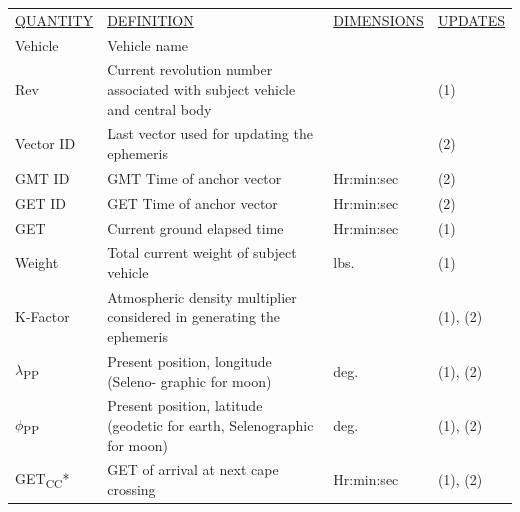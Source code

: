 \documentclass[11pt]{article} %
\begin{document}
\begin{center}
\begin{tabular}{ L{3cm} L{4.5cm} L{3cm} L{3.8cm} }
 \underline{QUANTITY} & \underline{DEFINITION} & \underline{DIMENSIONS} & \underline{UPDATES} \\ 
Vehicle & Vehicle name & & \\  
Rev & Current revolution number associated with subject vehicle and central body & & (1)\\
Vector ID & Last vector used for updating the ephemeris && (2)\\
GMT ID & GMT Time of anchor vector & Hr:min:sec & (2)\\
GET ID & GET Time of anchor vector & Hr:min:sec & (2)\\ 
GET & Current ground elapsed time & Hr:min:sec & (1)\\
Weight & Total current weight of subject vehicle & lbs. &(1)\\
K-Factor & Atmospheric density multiplier considered in generating the ephemeris&&(1), (2)\\
$\lambda$\textsubscript{PP}&Present position, longitude (Seleno- graphic for moon)& deg. & (1), (2)\\
$\phi$\textsubscript{PP}&Present position, latitude (geodetic for earth, Selenographic for moon)& deg. & (1), (2)\\
GET\textsubscript{CC}* & GET of arrival at next cape crossing&Hr:min:sec&(1), (2)\\
\end{tabular}
\end{center}
\end{document}
